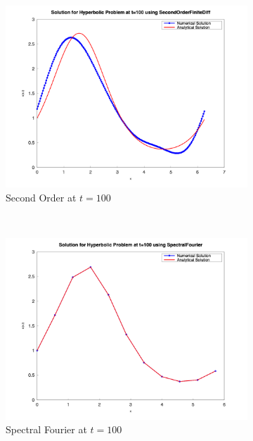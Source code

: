 \begin{figure}[H]
\begin{subfigure}{0.5\textwidth}
		\includegraphics[width=\textwidth]{media/hyperbolic_SecondOrderFiniteDiff_100.png}
		\caption{Second Order at $t=100$}
		\label{sfig:sublabel3}
	\end{subfigure}%
	~
	\begin{subfigure}{0.5\textwidth}
		\includegraphics[width=\textwidth]{media/hyperbolic_SpectralFourier_100.png}
		\caption{Spectral Fourier at $t=100$}
		\label{sfig:sublabel4}
	\end{subfigure}\\
	\begin{subfigure}{0.5\textwidth}

\end{subfigure}
\end{figure}
